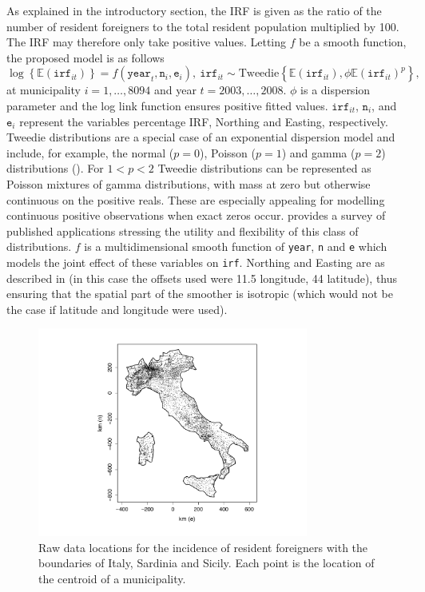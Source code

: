 As explained in the introductory section, the IRF is given as the ratio of the number of resident foreigners to the total resident population multiplied by 100. The IRF may therefore only take positive values. Letting $f$ be a smooth function, the proposed model is as follows
\begin{equation}
\log \left\{\mathbb{E}(\texttt{irf}_{it})\right\} = f(\texttt{year}_t,\texttt{n}_i,\texttt{e}_i), \ \texttt{irf}_{it} \sim \text{Tweedie}\left\{\mathbb{E}(\texttt{irf}_{it}),\phi \mathbb{E}(\texttt{irf}_{it})^{p}\right\},          
\label{PropM}
\end{equation}
at municipality $i=1,\ldots,8094$ and year $t=2003,\ldots,2008$. $\phi$ is a dispersion parameter and the log link function ensures positive fitted values. $\texttt{irf}_{it}$, $\texttt{n}_i$, and $\texttt{e}_i$ represent the variables percentage IRF, Northing and Easting, respectively. Tweedie distributions are a special case of an exponential dispersion model and include, for example, the normal ($p=0$), Poisson ($p=1$) and gamma ($p=2$) distributions (\cite{Jorgensen}). For $1<p<2$ Tweedie distributions can be represented as Poisson mixtures of gamma distributions, with mass at zero but otherwise continuous on the positive reals. These are especially appealing for modelling continuous positive observations when exact zeros occur.  provides a survey of published applications stressing the utility and flexibility of this class of distributions. $f$ is a multidimensional smooth function of \texttt{year}, \texttt{n} and \texttt{e} which models the joint effect of these variables on \texttt{irf}. Northing and Easting are as described in  (in this case the offsets used were 11.5 longitude, 44 latitude), thus ensuring that the spatial part of the smoother is isotropic (which would not be the case if latitude and longitude were used).

\begin{figure}[tb]
	\centering
		\includegraphics[width=3.5in]{it/pointmap.pdf}
	\caption{Raw data locations for the incidence of resident foreigners with the boundaries of Italy, Sardinia and Sicily. Each point is the location of the centroid of a municipality.}
	\label{pointmap}
\end{figure}

